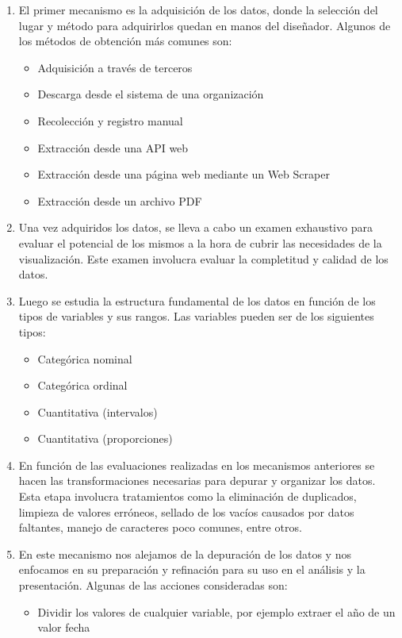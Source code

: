 \begin{enumerate}
  \item El primer mecanismo es la adquisición de los datos, donde la selección del lugar y método para adquirirlos quedan en manos del diseñador. Algunos de los métodos de obtención más comunes son:
  \begin{itemize}
    \item Adquisición a través de terceros
    \item Descarga desde el sistema de una organización
    \item Recolección y registro manual
    \item Extracción desde una API web
    \item Extracción desde una página web mediante un Web Scraper
    \item Extracción desde un archivo PDF
  \end{itemize}
  \item Una vez adquiridos los datos, se lleva a cabo un examen exhaustivo para evaluar el potencial de los mismos a la hora de cubrir las necesidades de la visualización. Este examen involucra evaluar la completitud y calidad de los datos.  \item Luego se estudia la estructura fundamental de los datos en función de los tipos de variables y sus rangos. Las variables pueden ser de los siguientes tipos:
  \begin{itemize}
    \item Categórica nominal
    \item Categórica ordinal
    \item Cuantitativa (intervalos)
    \item Cuantitativa (proporciones)
  \end{itemize}
  \item En función de las evaluaciones realizadas en los mecanismos anteriores se hacen las transformaciones necesarias para depurar y organizar los datos. Esta etapa involucra tratamientos como la eliminación de duplicados, limpieza de valores erróneos, sellado de los vacíos causados por datos faltantes, manejo de caracteres poco comunes, entre otros.
  \item En este mecanismo nos alejamos de la depuración de los datos y nos enfocamos en su preparación y refinación para su uso en el análisis y la presentación. Algunas de las acciones consideradas son:
  \begin{itemize}
    \item Dividir los valores de cualquier variable, por ejemplo extraer el año de un valor fecha

\end{itemize}
\end{enumerate}
